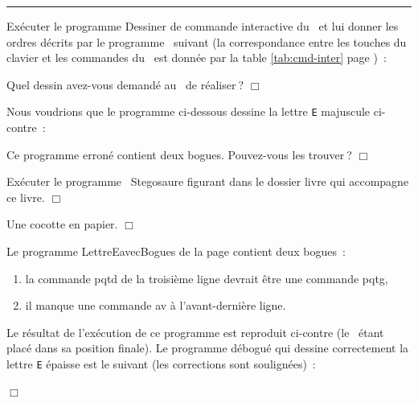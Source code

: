  
\noindent \rule{137mm}{0.1mm} %
\begin{exercice}{
Exécuter le programme {\idt Des\-si\-ner} de commande 
interactive du \robot\ et lui donner les ordres décrits par 
le programme \ocaml\ suivant (la correspondance entre les touches du
clavier et les commandes du \robot\ est donnée par la table
\ref{tab:cmd-inter} page \pageref{tab:cmd-inter})~:

\noindent Quel dessin avez-vous demandé au \robot\ de réaliser$\:$?
\noindent $\Box$}\end{exercice}
\begin{exercice}{
Nous voudrions que le programme ci-dessous dessine la lettre {\tt E} majuscule 
\hbox{ci-contre~:}

{\raggedright 
\vspace{\baselineskip}
\vspace*{3cm}%
\vspace*{-3cm}%
 \label{prog:LettreEavecBogues}
 
 }
\noindent Ce programme erroné contient deux bogues. Pouvez-vous les trouver$\:$?
\noindent $\Box$}\end{exercice}
\begin{exercice}{
Exécuter le programme \ocaml\ {\idt Stegosaure} figurant dans le dossier
{\idt livre} qui accompagne ce livre.
\noindent $\Box$}\end{exercice}
\begin{corrige}{
Une cocotte en papier.
\noindent $\Box$}\end{corrige}
\begin{corrige}{
Le programme {\idt LettreEavecBogues} de la page \pageref{prog:LettreEavecBogues} 
contient deux bogues~:\\
\begin{minipage}[t]{115mm}
\begin{enumerate}
\item la commande {\idt pqtd} de la troisième ligne
devrait être une commande {\idt pqtg},
\item il manque une commande {\idt av} à l'avant-dernière ligne. 
\end{enumerate}
Le résultat de l'exécution de ce programme est reproduit ci-contre
(le \robot\ étant placé dans sa position finale).
Le programme débogué qui dessine correctement la lettre {\tt E} épaisse est le suivant (les corrections sont 
sou\-li\-gnées)~:
\end{minipage}
\hfill
\begin{minipage}[t]{17mm}
\vspace{3.2cm}%
\hspace{-1.7cm}  %
\end{minipage}

\noindent $\Box$}\end{corrige}
